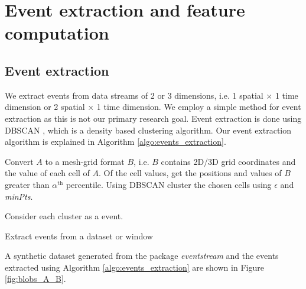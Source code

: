 \documentclass[11pt]{article}
\begin{document}
	\section{Event extraction and feature computation} \label{sec:EventExtract}
	
	\subsection{Event extraction}
	 We extract events from data streams of 2 or 3 dimensions, i.e. 1 spatial $ \times $ 1 time dimension or 2 spatial $ \times $ 1 time dimension.  We employ a simple method for event extraction as this is not our primary research goal.  Event extraction is done using DBSCAN \cite{ester1996density}, which is a density based clustering algorithm. Our event extraction algorithm is explained in Algorithm \ref{algo:events_extraction}.
	 
	 \DontPrintSemicolon
	 \begin{algorithm}[!ht]
	 	\footnotesize
	  	Convert $A$ to a mesh-grid format $B$, i.e. $B$ contains 2D/3D grid coordinates and the value of each cell of $A$.  \;
	 	Of the cell values, get the positions and values of $B$ greater than $\alpha^{\text{th}}$ percentile. \;
	 	Using DBSCAN cluster the chosen cells using $\epsilon$ and {\it minPts}. \;
	 	
	 	Consider each cluster as a event. \, 
	 	\caption{\footnotesize Extract events from a dataset or window}
	 	\label{algo:events_extraction}
	 \end{algorithm}
	 
	 A synthetic dataset generated from the package {\it eventstream} and the events extracted using Algorithm \ref{algo:events_extraction} are shown in Figure \ref{fig:blobs_A_B}. 
	 
\end{document}
